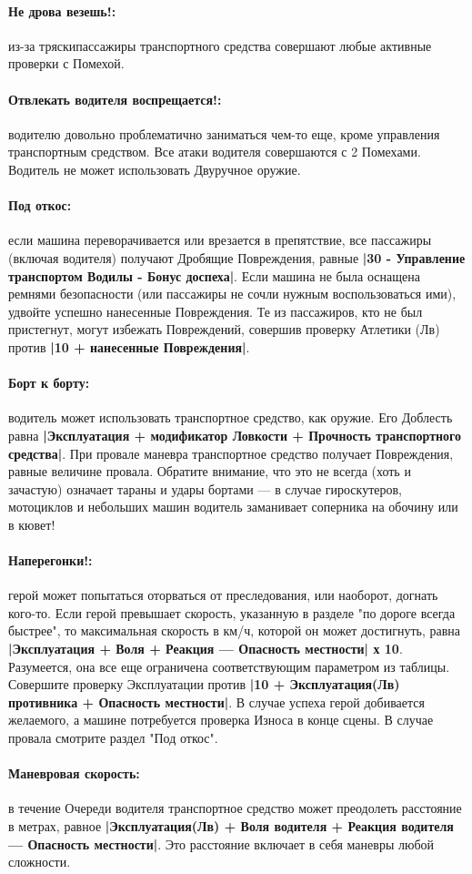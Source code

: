 \paragraph{Не дрова везешь!:} из-за тряскипассажиры транспортного средства совершают любые активные проверки с Помехой.
\paragraph{Отвлекать водителя воспрещается!:} водителю довольно проблематично заниматься чем-то еще, кроме управления транспортным средством. Все атаки водителя совершаются с 2 Помехами. Водитель не может использовать Двуручное оружие.
\paragraph{Под откос:} если машина переворачивается или врезается в препятствие, все пассажиры (включая водителя) получают Дробящие Повреждения, равные \textbf{|30 - Управление транспортом Водилы - Бонус доспеха|}. Если машина не была оснащена ремнями безопасности (или пассажиры не сочли нужным воспользоваться ими), удвойте успешно нанесенные Повреждения.
\newline
Те из пассажиров, кто не был пристегнут, могут избежать Повреждений, совершив проверку Атлетики (Лв) против \textbf{|10 + нанесенные Повреждения|}.
\paragraph{Борт к борту:} водитель может использовать транспортное средство, как оружие. Его Доблесть равна \textbf{|Эксплуатация + модификатор Ловкости + Прочность транспортного средства|}. При провале маневра транспортное средство получает Повреждения, равные величине провала. Обратите внимание, что это не всегда (хоть и зачастую) означает тараны и удары бортами — в случае гироскутеров, мотоциклов и небольших машин водитель заманивает соперника на обочину или в кювет!
\paragraph{Наперегонки!:} герой может попытаться оторваться от преследования, или наоборот, догнать кого-то. Если герой превышает скорость, указанную в разделе "по дороге всегда быстрее", то максимальная скорость в км/ч, которой он может достигнуть, равна \textbf{|Эксплуатация + Воля + Реакция — Опасность местности| х 10}. Разумеется, она все еще ограничена соответствующим параметром из таблицы. Совершите проверку Эксплуатации против \textbf{|10 + Эксплуатация(Лв) противника + Опасность местности|}. В случае успеха герой добивается желаемого, а машине потребуется проверка Износа в конце сцены. В случае провала смотрите раздел "Под откос".
\paragraph{Маневровая скорость:} в течение Очереди водителя транспортное средство может преодолеть расстояние в метрах, равное \textbf{|Эксплуатация(Лв) + Воля водителя + Реакция водителя — Опасность местности|}. Это расстояние включает в себя маневры любой сложности.